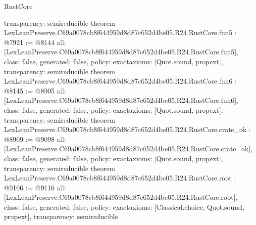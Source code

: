 \begin{lexlean}{RustCore}
\begin{coremodule}
{  transparency: semireducible
}
theorem LexLeanPreserve.C69a0078cb8f644959d8d87c652d4be05.R24.RustCore.fun5 : @7921 := @8144 {
  all: [LexLeanPreserve.C69a0078cb8f644959d8d87c652d4be05.R24.RustCore.fun5],
  class: false,
  generated: false,
  policy: exact{axioms: [Quot.sound, propext]},
  transparency: semireducible
}
theorem LexLeanPreserve.C69a0078cb8f644959d8d87c652d4be05.R24.RustCore.fun6 : @8145 := @8905 {
  all: [LexLeanPreserve.C69a0078cb8f644959d8d87c652d4be05.R24.RustCore.fun6],
  class: false,
  generated: false,
  policy: exact{axioms: [Quot.sound, propext]},
  transparency: semireducible
}
theorem LexLeanPreserve.C69a0078cb8f644959d8d87c652d4be05.R24.RustCore.crate_ok : @8909 := @9098 {
  all: [LexLeanPreserve.C69a0078cb8f644959d8d87c652d4be05.R24.RustCore.crate_ok],
  class: false,
  generated: false,
  policy: exact{axioms: [Quot.sound, propext]},
  transparency: semireducible
}
theorem LexLeanPreserve.C69a0078cb8f644959d8d87c652d4be05.R24.RustCore.root : @9106 := @9116 {
  all: [LexLeanPreserve.C69a0078cb8f644959d8d87c652d4be05.R24.RustCore.root],
  class: false,
  generated: false,
  policy: exact{axioms: [Classical.choice, Quot.sound, propext]},
  transparency: semireducible
}


\end{coremodule}
\end{lexlean}
